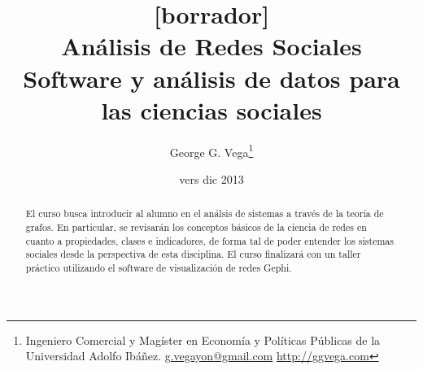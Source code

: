\documentclass{article}
\title{{\color{Gray} [borrador]} \\An\'alisis de Redes Sociales\\{\normalsize Software y an\'alisis de datos para las ciencias sociales}}
\author{George G. Vega\thanks{Ingeniero Comercial y Mag\'ister en Econom\'ia y Pol\'iticas Públicas de la Universidad Adolfo Ib\'a\~nez. \href{mailito:g.vegayon@gmail.com}{g.vegayon@gmail.com} \href{http://www.ggvega.com}{http://ggvega.com}}}
\date{vers dic 2013}
\begin{document}
\maketitle

\begin{abstract}
El curso busca introducir al alumno en el an\'alsis de sistemas a trav\'es de la
teor\'ia de grafos. En particular, se revisar\'an los conceptos b\'asicos de la ciencia
de redes en cuanto a propiedades, clases e indicadores, de forma tal de poder entender
los sistemas sociales desde la perspectiva de esta disciplina. El curso finalizará con un taller pr\'actico utilizando el software de visualizaci\'on de redes Gephi.
\end{abstract}

\nocite{*}


\end{document}

